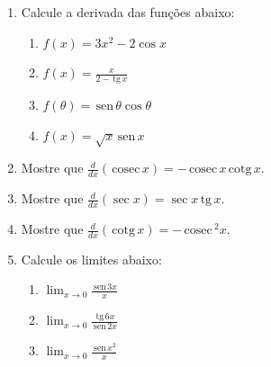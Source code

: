 \documentclass[a4paper,5pt]{amsbook}
\newcommand{\sen}{\,\mbox{sen}\,}
\newcommand{\tg}{\,\mbox{tg}\,}
\newcommand{\cosec}{\,\mbox{cosec}\,}
\newcommand{\cotg}{\,\mbox{cotg}\,}
\newcommand{\ds}{\displaystyle}
\newcommand{\ra}{\rightarrow}
\begin{document}
\vspace{1cm}
\begin{enumerate}
    \vspace{0.5cm}
    \item Calcule a derivada das fun\c{c}\~oes abaixo:
        \begin{enumerate}
            \vspace{0.3cm}
            \item $f(x)=3x^2-2\cos{x}$
            \vspace{0.3cm}
            \item $f(x)=\ds\frac{x}{2-\tg{x}}$
            \vspace{0.3cm}
            \item $f(\theta)=\sen{\theta} \cos{\theta}$
            \vspace{0.3cm}
            \item $f(x)=\sqrt{x}\sen{x}$
        \end{enumerate}

    \vspace{0.5cm}
    \item Mostre que $\ds\frac{d}{dx}(\cosec{x}) = -\cosec{x} \cotg{x}$.

    \vspace{0.5cm}
    \item Mostre que $\ds\frac{d}{dx}(\sec{x}) = \sec{x}\tg{x}$.

    \vspace{0.5cm}
    \item Mostre que $\ds\frac{d}{dx}(\cotg{x}) = -\cosec^2{x}$.

    \vspace{0.5cm}
    \item Calcule os limites abaixo:
        \begin{enumerate}
            \vspace{0.3cm}
            \item $\ds\lim_{x\ra 0} \frac{\sen{3x}}{x}$
            \vspace{0.3cm}
            \item $\ds\lim_{x\ra 0} \frac{\tg{6x}}{\sen{2x}}$
            \vspace{0.3cm}
            \item $\ds\lim_{x\ra 0} \frac{\sen{x^2}}{x}$
        \end{enumerate}
\end{enumerate}
\end{document}
